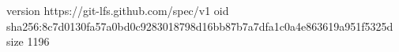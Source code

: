 version https://git-lfs.github.com/spec/v1
oid sha256:8c7d0130fa57a0bd0c9283018798d16bb87b7a7dfa1c0a4e863619a951f5325d
size 1196
